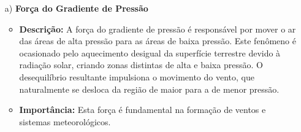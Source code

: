  \begin{itemize}
    \item[a)] \textbf{Força do Gradiente de Pressão}
    \begin{itemize}
        \item \textbf{Descrição:} A força do gradiente de pressão é responsável por mover o ar das áreas de alta pressão para as áreas de baixa pressão. Este fenômeno é ocasionado pelo aquecimento desigual da superfície terrestre devido à radiação solar, criando zonas distintas de alta e baixa pressão. O desequilíbrio resultante impulsiona o movimento do vento, que naturalmente se desloca da região de maior para a de menor pressão.
        \item \textbf{Importância:} Esta força é fundamental na formação de ventos e sistemas meteorológicos.
    \end{itemize}
    

\end{itemize}
